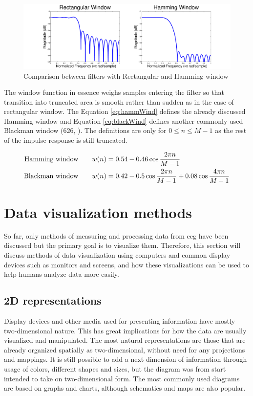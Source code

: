 \begin{figure}[htb]
	\centering
	\includegraphics[width=1\linewidth]{fig/filterRiples.pdf}
	\caption{Comparison between filters with Rectangular and Hamming window}
	\label{fig:filterRiples}
\end{figure}

The window function in essence weighs samples entering the filter so that transition into truncated area is smooth rather than sudden as in the case of rectangular window. The Equation \ref{eq:hammWind} defines the already discussed Hamming window and Equation \ref{eq:blackWind} defines another commonly used Blackman window (626, \cite{DSP3}). The definitions are only for $0 \leq n \leq M-1$ as the rest of the impulse response is still truncated.

\begin{align}
\text{Hamming window\qquad}& w(n) = 0.54 - 0.46\cos \frac{2 \pi n}{M -1} \label{eq:hammWind}\\
\text{Blackman window\qquad}& w(n) = 0.42 - 0.5\cos \frac{2 \pi n}{M - 1} + 0.08\cos \frac{4 \pi n}{M - 1} \label{eq:blackWind}
\end{align}

\section{Data visualization methods}
So far, only methods of measuring and processing data from \gls{eeg} have been
discussed but the primary goal is to visualize them. Therefore, this section
will discuss methods of data visualization using computers and common
display devices such as monitors and screens, and how these visualizations can
be used to help humans analyze data more easily.

\subsection{2D representations}
Display devices and other media used for presenting information have mostly
two-dimensional nature. This has great implications for how the data are usually
visualized and manipulated. The most natural representations are those that are
already organized spatially as two-dimensional, without need for any projections
and mappings. It is still possible to add a next dimension of information through usage of
colors, different shapes and sizes, but the diagram was from start intended to
take on two-dimensional form. The most commonly used diagrams are based on
graphs and charts, although schematics and maps are also popular.

